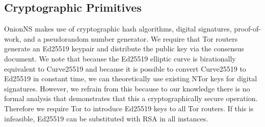 \documentclass{sig-alternate}
\begin{document}
\subsection{Cryptographic Primitives} %

OnionNS makes use of cryptographic hash algorithms, digital signatures, proof-of-work, and a pseudorandom number generator. We require that Tor routers generate an Ed25519\cite{bernstein2011high} keypair and distribute the public key via the consensus document. We note that because the Ed25519 elliptic curve is birationally equivalent to Curve25519 and because it is possible to convert Curve25519 to Ed25519 in constant time, we can theoretically use existing NTor keys for digital signatures. However, we refrain from this because to our knowledge there is no formal analysis that demonstrates that this a cryptographically secure operation. Therefore we require Tor to introduce Ed25519 keys to all Tor routers. If this is infeasible, Ed25519 can be substituted with RSA in all instances.
\end{document}
